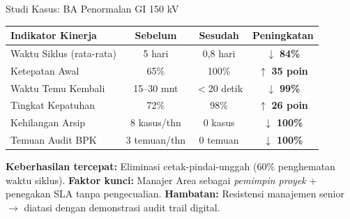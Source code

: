 \documentclass[aspectratio=169,11pt]{beamer}
\begin{document}
\begin{frame}{Studi Kasus: BA Penormalan GI 150 kV}
    \vspace{0.2cm}
    \begin{table}
        \centering
        \scriptsize
        \begin{tabularx}{\textwidth}{@{} X c c c @{}}
            \toprule
            \textbf{Indikator Kinerja} & \textbf{Sebelum} & \textbf{Sesudah} & \textbf{Peningkatan} \\
            \midrule
            Waktu Siklus (rata-rata) & 5 hari & 0,8 hari & $\downarrow$ \textbf{84\%} \\
            Ketepatan Awal & 65\% & 100\% & $\uparrow$ \textbf{35 poin} \\
            Waktu Temu Kembali & 15--30 mnt & $<$20 detik & $\downarrow$ \textbf{99\%} \\
            Tingkat Kepatuhan & 72\% & 98\% & $\uparrow$ \textbf{26 poin} \\
            Kehilangan Arsip & 8 kasus/thn & 0 kasus & $\downarrow$ \textbf{100\%} \\
            Temuan Audit BPK & 3 temuan/thn & 0 temuan & $\downarrow$ \textbf{100\%} \\
            \bottomrule
        \end{tabularx}
    \end{table}
    \vspace{0.2cm}
    \begin{greenbox}
        \scriptsize
        \textbf{Keberhasilan tercepat:} Eliminasi cetak-pindai-unggah (60\% penghematan waktu siklus). \quad
        \textbf{Faktor kunci:} Manajer Area sebagai \textit{pemimpin proyek} + penegakan SLA tanpa pengecualian. \quad
        \textbf{Hambatan:} Resistensi manajemen senior $\rightarrow$ diatasi dengan demonstrasi audit trail digital.
    \end{greenbox}
\end{frame}
\end{document}
